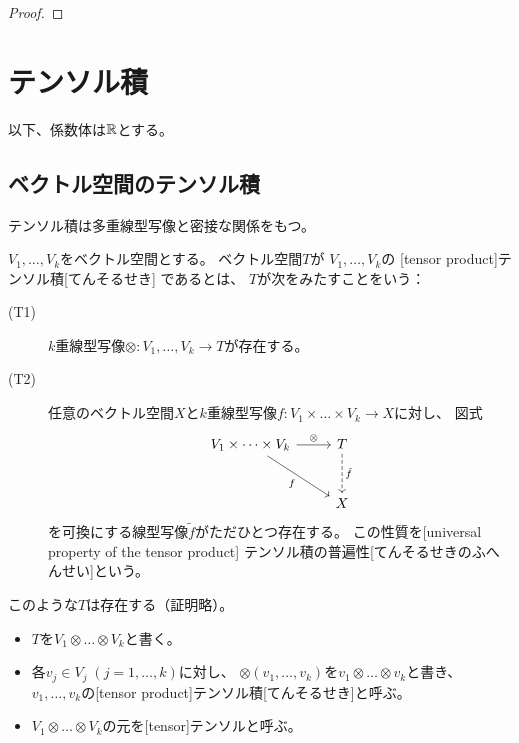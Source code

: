 \documentclass[report]{jlreq}
\begin{document}
\begin{proof}
    \TODO{}
\end{proof}








%
\chapter{テンソル積}

以下、係数体は$\mathbb{R}$とする。

%
\section{ベクトル空間のテンソル積}

テンソル積は多重線型写像と密接な関係をもつ。

\begin{definition}[テンソル積]
    $V_1, \dots, V_k$をベクトル空間とする。
    ベクトル空間$T$が
    $V_1, \dots, V_k$の
    [tensor product]{テンソル積}[てんそるせき]
    であるとは、
    $T$が次をみたすことをいう：
    \begin{description}
        \item[(T1)]
            $k$重線型写像$\otimes \colon V_1, \dots, V_k \to T$が存在する。
        \item[(T2)]
            任意のベクトル空間$X$と$k$重線型写像$f \colon V_1 \times \dots \times V_k \to X$に対し、
            図式
            \begin{equation}
                \begin{tikzcd}[row sep=large]
                    V_1 \times \dots \times V_k \ar{r}{\otimes}
                        \ar{dr}[swap]{f}
                        & T \ar[dashed]{d}{\tilde{f}} \\
                    & X
                \end{tikzcd}
            \end{equation}
            を可換にする線型写像$\tilde{f}$がただひとつ存在する。
            この性質を[universal property of the tensor product]
            {テンソル積の普遍性}[てんそるせきのふへんせい]という。
    \end{description}
    このような$T$は存在する（証明略）。
    \begin{itemize}
        \item $T$を$V_1 \otimes \dots \otimes V_k$と書く。
        \item 各$v_j \in V_j\; (j = 1, \dots, k)$に対し、
            $\otimes(v_1, \dots, v_k)$を$v_1 \otimes \dots \otimes v_k$と書き、
            $v_1, \dots, v_k$の[tensor product]{テンソル積}[てんそるせき]と呼ぶ。
        \item $V_1 \otimes \dots \otimes V_k$の元を[tensor]{テンソル}と呼ぶ。
    \end{itemize}
\end{definition}
\end{document}
